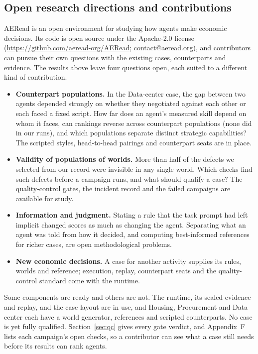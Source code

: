 \subsection{Open research directions and contributions}
\label{sec:open-directions}

AERead is an open environment for studying how agents make economic
decisions. Its code is open source under the Apache-2.0 license
(\url{https://github.com/aeread-org/AERead}; contact@aeread.org), and contributors can
pursue their own questions with the existing cases, counterparts and
evidence. The results above leave four questions open, each suited to a
different kind of contribution.
\begin{itemize}
\item \textbf{Counterpart populations.} In the Data-center case, the gap between two
agents depended strongly on whether they negotiated against each other or each faced a fixed script.
How far does an agent's measured skill depend on whom it faces, can
rankings reverse across counterpart populations (none did in our runs),
and which populations separate distinct strategic capabilities? The
scripted styles, head-to-head pairings and counterpart seats are in place.
\item \textbf{Validity of populations of worlds.} More than half of the defects
we selected from our record were invisible in any single world. Which checks find
such defects before a campaign runs, and what should qualify a case? The
quality-control gates, the incident record and the failed campaigns are
available for study.
\item \textbf{Information and judgment.} Stating a rule that the task prompt had left
implicit changed scores as much as changing the agent. Separating what an
agent was told from how it decided, and computing best-informed references
for richer cases, are open methodological problems.
\item \textbf{New economic decisions.} A case for another activity
supplies its rules, worlds and reference; execution, replay, counterpart
seats and the quality-control standard come with the runtime.
\end{itemize}

Some components are ready and others are not. The runtime, its sealed evidence and
replay, and the case layout are in use, and Housing, Procurement and Data
center each have a world generator, references and scripted counterparts.
No case is yet fully qualified. Section~\ref{sec:qc} gives every gate
verdict, and Appendix~F lists each campaign's open checks, so a contributor
can see what a case still needs before its results can rank agents.

